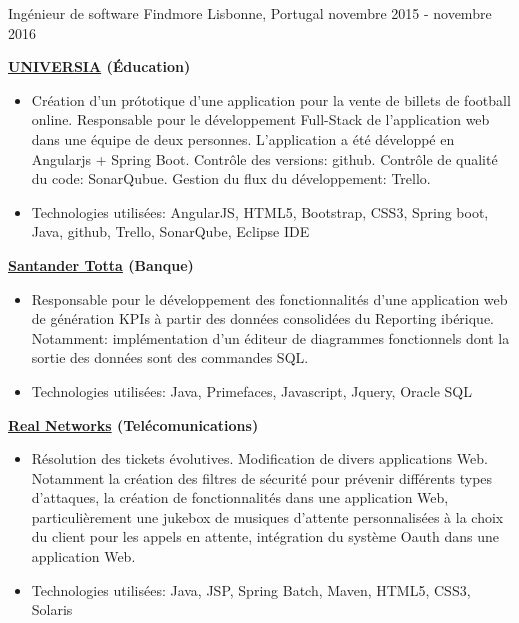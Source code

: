 \begin{cventries}
\cventry
{Ingénieur de software} %
{Findmore} %
{Lisbonne, Portugal} %
{novembre 2015 - novembre 2016} %
{ %
\begin{cvitems}
\item { \textbf{\href{http://www.universia.pt/}{UNIVERSIA} (Éducation)}}
\begin{itemize}
\item {Création d’un prótotique d’une application pour la vente de billets de football online.
Responsable pour le développement Full-Stack de l'application web dans une équipe de deux personnes. L'application a été développé en Angularjs + Spring Boot. Contrôle des versions: github. Contrôle de qualité du code: SonarQubue. Gestion du flux du développement: Trello.}
\item {Technologies utilisées: AngularJS, HTML5, Bootstrap, CSS3, Spring boot, Java, github, Trello, SonarQube, Eclipse IDE}
\end{itemize}
\item { \textbf{\href{https://www.santandertotta.pt/pt_PT/Particulares.html}{Santander Totta} (Banque)}}
\begin{itemize}
\item {Responsable pour le développement des fonctionnalités d'une application web de génération KPIs à partir des données consolidées du Reporting ibérique. Notamment: implémentation d'un éditeur de diagrammes fonctionnels dont la sortie des données sont des commandes SQL.}
\item {Technologies utilisées: Java, Primefaces, Javascript, Jquery, Oracle SQL}
\end{itemize}
\item { \textbf{\href{https://www.realnetworks.com/}{Real Networks} (Telécomunications)}}
\begin{itemize}
\item {Résolution des tickets évolutives. Modification de divers applications Web. Notamment la création des filtres de sécurité pour prévenir différents types d'attaques, la création de fonctionnalités dans une application Web, particulièrement une jukebox de musiques d'attente personnalisées à la choix du client pour les appels en attente, intégration du système Oauth dans une application Web.}
\item {Technologies utilisées: Java, JSP, Spring Batch, Maven, HTML5, CSS3,  Solaris}
\end{itemize}
\end{cvitems}
}


\end{cventries}
